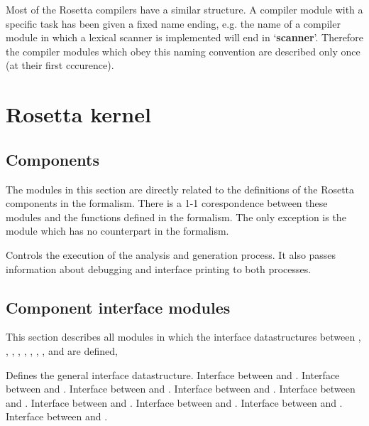 Most of the Rosetta compilers have a similar structure. A compiler module
with a specific task has been given a fixed name ending, e.g. the
name of a compiler module in which a lexical scanner is implemented will
end in `{\bf scanner}'.  Therefore the compiler modules which obey this
naming convention are described only once (at their first cccurence).

\newpage
\section{Rosetta kernel}
\subsection{Components}
The modules in this section are directly related to the definitions of the
Rosetta components in the formalism. There is a 1-1 corespondence between
these modules and the functions defined in the formalism. The only exception
is the module  which has no counterpart in the formalism.

\bsc
{} Controls the execution of the analysis and generation process.
               It also passes information about debugging and interface printing
               to both processes.
   \bsc
      \bsc
      \esc
   \esc
{}
   \bsc
      \bsc
      \esc
   \esc
\esc

\subsection{Component interface modules}

This section describes all modules in which the interface datastructures between
, , , , ,
, , ,  and
 are defined,

\bsc
{} Defines the general interface datastructure.
   \bsc
    Interface between  and .
    Interface between  and .
    Interface between  and .
    Interface between  and .
    Interface between  and .
    Interface between  and .
    Interface between  and .
    Interface between  and .
    Interface between  and .
   \esc
\esc

